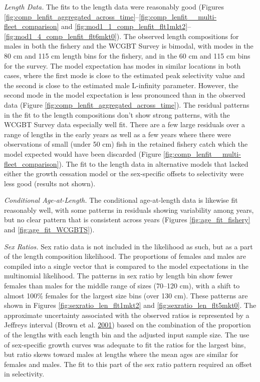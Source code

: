 \documentclass[12pt,]{article}
\begin{document}
\emph{Length Data.} The fits to the length data were reasonably good
(Figures
\ref{fig:comp_lenfit_aggregated_across_time}--\ref{fig:comp_lenfit__multi-fleet_comparison}
and
\ref{fig:mod1_1_comp_lenfit_flt1mkt2}--\ref{fig:mod1_4_comp_lenfit_flt6mkt0}).
The observed length compositions for males in both the fishery and the
WCGBT Survey is bimodal, with modes in the 80 cm and 115 cm length bins
for the fishery, and in the 60 cm and 115 cm bins for the survey. The
model expectation has modes in similar locations in both cases, where
the first mode is close to the estimated peak selectivity value and the
second is close to the estimated male L-infinity parameter. However, the
second mode in the model expectation is less pronounced than in the
observed data (Figure \ref{fig:comp_lenfit_aggregated_across_time}). The
residual patterns in the fit to the length compositions don't show
strong patterns, with the WCGBT Survey data especially well fit. There
are a few large residuals over a range of lengths in the early years as
well as a few years where there were observations of small (under 50 cm)
fish in the retained fishery catch which the model expected would have
been discarded (Figure \ref{fig:comp_lenfit__multi-fleet_comparison}).
The fit to the length data in alternative models that lacked either the
growth cessation model or the sex-specific offsets to selectivity were
less good (results not shown).

\emph{Conditional Age-at-Length.} The conditional age-at-length data is
likewise fit reasonably well, with some patterns in residuals showing
variability among years, but no clear pattern that is consistent across
years (Figures \ref{fig:age_fit_fishery} and \ref{fig:age_fit_WCGBTS}).

\emph{Sex Ratios.} Sex ratio data is not included in the likelihood as
such, but as a part of the length composition likelihood. The
proportions of females and males are compiled into a single vector that
is compared to the model expectations in the multinomial likelihood. The
patterns in sex ratio by length bin show fewer females than males for
the middle range of sizes (70--120 cm), with a shift to almost 100\%
females for the largest size bins (over 130 cm). These patterns are
shown in Figures \ref{fig:sexratio_len_flt1mkt2} and
\ref{fig:sexratio_len_flt5mkt0}. The approximate uncertainty associated
with the observed ratios is represented by a Jeffreys interval (Brown et
al. \protect\hyperlink{ref-brown2001interval}{2001}) based on the
combination of the proportion of the lengths with each length bin and
the adjusted input sample size. The use of sex-specific growth curves
was adequate to fit the ratios for the largest bins, but ratio skews
toward males at lengths where the mean ages are similar for females and
males. The fit to this part of the sex ratio pattern required an offset
in selectivity.
\end{document}
